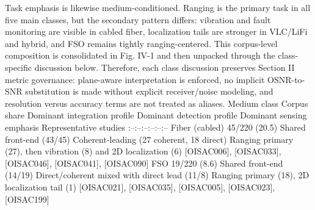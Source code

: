{}Task emphasis is likewise medium-conditioned. Ranging is the primary task in all five main classes, but the secondary pattern differs: vibration and fault monitoring are visible in cabled fiber, localization tails are stronger in VLC/LiFi and hybrid, and FSO remains tightly ranging-centered. This corpus-level composition is consolidated in Fig. IV-1 and then unpacked through the class-specific discussion below. Therefore, each class discussion preserves Section II metric governance: plane-aware interpretation is enforced, no implicit OSNR-to-SNR substitution is made without explicit receiver/noise modeling, and resolution versus accuracy terms are not treated as aliases.\markdownRendererParagraphSeparator
{}\markdownRendererParagraphSeparator
{}\markdownRendererPipe{} Medium class \markdownRendererPipe{} Corpus share \markdownRendererPipe{} Dominant integration profile \markdownRendererPipe{} Dominant detection profile \markdownRendererPipe{} Dominant sensing emphasis \markdownRendererPipe{} Representative studies \markdownRendererPipe{}\markdownRendererSoftLineBreak
{}\markdownRendererPipe{}:--\markdownRendererPipe{}:--\markdownRendererPipe{}:--\markdownRendererPipe{}:--\markdownRendererPipe{}:--\markdownRendererPipe{}:--\markdownRendererPipe{}\markdownRendererSoftLineBreak
{}\markdownRendererPipe{} Fiber (cabled) \markdownRendererPipe{} 45/220 (20.5\markdownRendererPercentSign{}) \markdownRendererPipe{} Shared front-end (43/45) \markdownRendererPipe{} Coherent-leading (27 coherent, 18 direct) \markdownRendererPipe{} Ranging primary (27), then vibration (8) and 2D localization (6) \markdownRendererPipe{} [O\markdownRendererUnderscore{}ISAC\markdownRendererUnderscore{}006], [O\markdownRendererUnderscore{}ISAC\markdownRendererUnderscore{}033], [O\markdownRendererUnderscore{}ISAC\markdownRendererUnderscore{}046], [O\markdownRendererUnderscore{}ISAC\markdownRendererUnderscore{}041], [O\markdownRendererUnderscore{}ISAC\markdownRendererUnderscore{}090] \markdownRendererPipe{}\markdownRendererSoftLineBreak
{}\markdownRendererPipe{} FSO \markdownRendererPipe{} 19/220 (8.6\markdownRendererPercentSign{}) \markdownRendererPipe{} Shared front-end (14/19) \markdownRendererPipe{} Direct/coherent mixed with direct lead (11/8) \markdownRendererPipe{} Ranging primary (18), 2D localization tail (1) \markdownRendererPipe{} [O\markdownRendererUnderscore{}ISAC\markdownRendererUnderscore{}021], [O\markdownRendererUnderscore{}ISAC\markdownRendererUnderscore{}035], [O\markdownRendererUnderscore{}ISAC\markdownRendererUnderscore{}005], [O\markdownRendererUnderscore{}ISAC\markdownRendererUnderscore{}023], [O\markdownRendererUnderscore{}ISAC\markdownRendererUnderscore{}199] \markdownRendererPipe{}\markdownRendererSoftLineBreak

